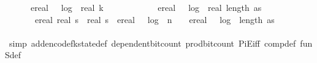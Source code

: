 \begin{isabellebody}
\ \ \ \ \ \ ereal\ {\isacharparenleft}{\kern0pt}{}\ {\isacharasterisk}{\kern0pt}\ log\ {}\ {\isacharparenleft}{\kern0pt}real\ k\ {\isacharplus}{\kern0pt}\ {}{\isacharparenright}{\kern0pt}\ {\isacharplus}{\kern0pt}\ {}{\isacharparenright}{\kern0pt}\ {\isacharplus}{\kern0pt}\ {\isacharparenleft}{\kern0pt}\isanewline
\ \ \ \ \ \ ereal\ {\isacharparenleft}{\kern0pt}{}\ {\isacharasterisk}{\kern0pt}\ log\ {}\ {\isacharparenleft}{\kern0pt}real\ {\isacharparenleft}{\kern0pt}length\ as{\isacharparenright}{\kern0pt}\ {\isacharplus}{\kern0pt}\ {}{\isacharparenright}{\kern0pt}\ {\isacharplus}{\kern0pt}\ {}{\isacharparenright}{\kern0pt}\ {\isacharplus}{\kern0pt}\ {\isacharparenleft}{\kern0pt}\isanewline
\ \ \ \ \ \ \ {\isacharparenleft}{\kern0pt}ereal\ {\isacharparenleft}{\kern0pt}real\ s\ {\isacharasterisk}{\kern0pt}\ real\ s\ {\isacharasterisk}{\kern0pt}\ {\isacharparenleft}{\kern0pt}{\isacharparenleft}{\kern0pt}ereal\ {\isacharparenleft}{\kern0pt}{}\ {\isacharasterisk}{\kern0pt}\ log\ {}\ {\isacharparenleft}{\kern0pt}{\isacharparenleft}{\kern0pt}n{\isacharparenright}{\kern0pt}{\isacharplus}{\kern0pt}{}{\isacharparenright}{\kern0pt}\ {\isacharplus}{\kern0pt}\ {}{\isacharparenright}{\kern0pt}\ {\isacharplus}{\kern0pt}\ ereal\ {\isacharparenleft}{\kern0pt}{}\ {\isacharasterisk}{\kern0pt}\ log\ {}\ {\isacharparenleft}{\kern0pt}{\isacharparenleft}{\kern0pt}length\ as{\isacharparenright}{\kern0pt}{\isacharplus}{\kern0pt}{}{\isacharparenright}{\kern0pt}\ {\isacharplus}{\kern0pt}\ {}{\isacharparenright}{\kern0pt}{\isacharparenright}{\kern0pt}\ {\isacharplus}{\kern0pt}\ {}{\isacharparenright}{\kern0pt}{\isacharparenright}{\kern0pt}{\isacharplus}{\kern0pt}\ {}{\isacharparenright}{\kern0pt}{\isacharparenright}{\kern0pt}{\isacharparenright}{\kern0pt}{\isacharparenright}{\kern0pt}{\isachardoublequoteclose}\isanewline
\ \ \ \ \ \ \isamarkupfalse%
\ {\isacharparenleft}{\kern0pt}simp\ add{\isacharcolon}{\kern0pt}encode{\isacharunderscore}{\kern0pt}fk{\isacharunderscore}{\kern0pt}state{\isacharunderscore}{\kern0pt}def\ dependent{\isacharunderscore}{\kern0pt}bit{\isacharunderscore}{\kern0pt}count\ prod{\isacharunderscore}{\kern0pt}bit{\isacharunderscore}{\kern0pt}count\ PiE{\isacharunderscore}{\kern0pt}iff\ comp{\isacharunderscore}{\kern0pt}def\ fun\isactrlsub S{\isacharunderscore}{\kern0pt}def\isanewline

\end{isabellebody}
